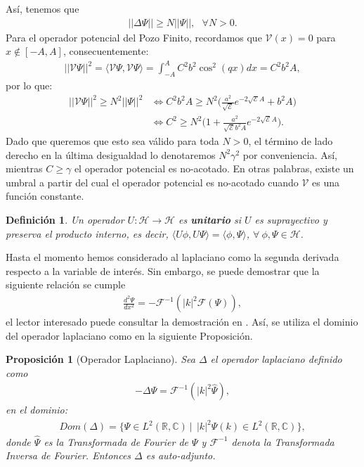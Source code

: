 \documentclass[12pt]{article}
\newtheorem{defn}[teo]{Definición}
\newtheorem{prop}[teo]{Proposición}
\theoremstyle{definition}
\newcommand*{\field}[1]{\mathbb{#1}}
\begin{document}
Así, tenemos que
\begin{align*}
    ||\Delta\Psi|| \geq N ||\Psi||, \:\:\:\forall N>0.
\end{align*}
\noindent
Para el operador potencial del Pozo Finito, recordamos que $\mathcal{V}(x)=0$ para $x\notin [-A,A]$, consecuentemente:
\begin{align*}
    ||\mathcal{V}\Psi||^2 = \langle \mathcal{V}\Psi,\mathcal{V}\Psi\rangle = \int_{-A}^{A}C^2b^2\cos^2(qx)dx = C^2b^2A,
\end{align*}
por lo que:
\begin{align*}
    ||\mathcal{V}\Psi||^2 \geq N^2||\Psi||^2
    & \Longleftrightarrow 
    C^2b^2A \geq N^2\bigg( \frac{a^2}{\sqrt{\mathcal{E}}}e^{-2\sqrt{\mathcal{E}}A} + b^2A \bigg) \\
    & \Longleftrightarrow 
    C^2 \geq N^2\bigg(1 + \frac{a^2}{\sqrt{\mathcal{E}}b^2A}e^{-2\sqrt{\mathcal{E}}A}\bigg).
\end{align*}
Dado que queremos que esto sea válido para toda $N>0$, el término de lado derecho en la última desigualdad lo denotaremos $N^2\gamma^2$ por conveniencia. Así, mientras $C\geq\gamma$ el operador potencial es no-acotado. En otras palabras, existe un umbral a partir del cual el operador potencial es no-acotado cuando $\mathcal{V}$ es una función constante. 
\begin{defn}
    Un operador $U:\mathcal{H}\rightarrow\mathcal{H}$ es \textbf{unitario} si $U$ es suprayectivo y preserva el producto interno, es decir, $\langle U\phi,U\Psi\rangle = \langle\phi,\Psi\rangle$, $\forall\:\phi,\Psi \in \mathcal{H}$.
\end{defn}
\noindent
Hasta el momento hemos considerado al laplaciano como la segunda derivada respecto a la variable de interés. Sin embargo, se puede demostrar que la siguiente relación se cumple
\begin{align*}
    \frac{d^2 \Psi}{dx^2} = - \mathcal{F}^{-1}(|k|^2\mathcal{F}(\Psi)),
\end{align*}
el lector interesado puede consultar la demostración en \cite[ ]{QTM}. Así, se utiliza el dominio del operador laplaciano como en la siguiente Proposición.
\begin{prop}[Operador Laplaciano]
    Sea $\Delta$ el operador laplaciano definido como
    \begin{align*}
        -\Delta\Psi = \mathcal{F}^{-1}(|k|^{2} \hat{\Psi}),
    \end{align*}
    en el dominio:
    \begin{align*} Dom(\Delta) = \{\Psi\in L^{2}(\field{R},\field{C}) \:|\:
       \: |k|^{2}\hat{\Psi}(k) \in L^{2}(\field{R},\field{C})\},
    \end{align*}
donde $\hat{\Psi}$ es la Transformada de Fourier de $\Psi$ y $\mathcal{F}^{-1}$ denota la Transformada Inversa de Fourier. Entonces $\Delta$ es auto-adjunto. 
\label{prop:DomLap}
\end{prop}
\end{document}
